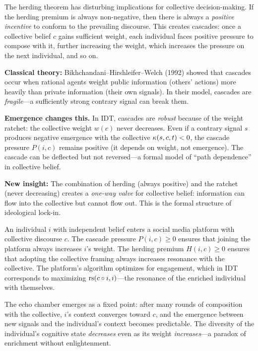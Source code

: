 \begin{interpretation}
The herding theorem has disturbing implications for collective
decision-making. If the herding premium is always non-negative, then
there is always a \emph{positive incentive} to conform to the prevailing
discourse. This creates cascades: once a collective belief $c$ gains
sufficient weight, each individual faces positive pressure to compose
with it, further increasing the weight, which increases the pressure on
the next individual, and so on.

\textbf{Classical theory:} Bikhchandani--Hirshleifer--Welch (1992) showed
that cascades occur when rational agents weight public information
(others' actions) more heavily than private information (their own signals).
In their model, cascades are \emph{fragile}---a sufficiently strong
contrary signal can break them.

\textbf{Emergence changes this.} In IDT, cascades are \emph{robust} because
of the weight ratchet: the collective weight $w(c)$ never decreases. Even
if a contrary signal $s$ produces negative emergence with the collective
$\kappa(s, c, t) < 0$, the cascade pressure $P(i, c)$ remains positive
(it depends on weight, not emergence). The cascade can be deflected but
not reversed---a formal model of ``path dependence'' in collective belief.

\textbf{New insight:} The combination of herding (always positive) and the
ratchet (never decreasing) creates a \emph{one-way valve} for collective
belief: information can flow into the collective but cannot flow out.
This is the formal structure of ideological lock-in.
\end{interpretation}

\begin{game}
An individual $i$ with independent belief enters a social media platform
with collective discourse $c$. The cascade pressure $P(i, c) \geq 0$
ensures that joining the platform always increases $i$'s weight. The
herding premium $H(i, c) \geq 0$ ensures that adopting the collective
framing always increases resonance with the collective. The platform's
algorithm optimizes for engagement, which in IDT corresponds to
maximizing $\mathrm{rs}(c \circ i, i)$---the resonance of the enriched
individual with themselves.

The echo chamber emerges as a fixed point: after many rounds of
composition with the collective, $i$'s context converges toward $c$,
and the emergence between new signals and the individual's context
becomes predictable. The diversity of the individual's cognitive state
\emph{decreases} even as its weight \emph{increases}---a paradox of
enrichment without enlightenment.
\end{game}


